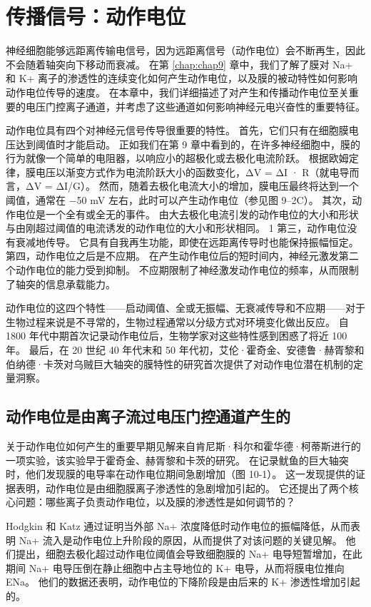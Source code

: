 \chapter{传播信号：动作电位} \label{chap:chap10}
神经细胞能够远距离传输电信号，因为远距离信号（动作电位）会不断再生，因此不会随着轴突向下移动而衰减。 
在第 \ref{chap:chap9} 章中，我们了解了膜对 Na+ 和 K+ 离子的渗透性的连续变化如何产生动作电位，以及膜的被动特性如何影响动作电位传导的速度。 
在本章中，我们详细描述了对产生和传播动作电位至关重要的电压门控离子通道，并考虑了这些通道如何影响神经元电兴奋性的重要特征。


动作电位具有四个对神经元信号传导很重要的特性。 
首先，它们只有在细胞膜电压达到阈值时才能启动。 
正如我们在第 9 章中看到的，在许多神经细胞中，膜的行为就像一个简单的电阻器，以响应小的超极化或去极化电流阶跃。 
根据欧姆定律，膜电压以渐变方式作为电流阶跃大小的函数变化，ΔV = ΔI · R（就电导而言，ΔV = ΔI/G）。 
然而，随着去极化电流大小的增加，膜电压最终将达到一个阈值，通常在 −50 mV 左右，此时可以产生动作电位（参见图 9–2C）。 
其次，动作电位是一个全有或全无的事件。 
由大去极化电流引发的动作电位的大小和形状与由刚超过阈值的电流诱发的动作电位的大小和形状相同。
1 第三，动作电位没有衰减地传导。 
它具有自我再生功能，即使在远距离传导时也能保持振幅恒定。 
第四，动作电位之后是不应期。 
在产生动作电位后的短时间内，神经元激发第二个动作电位的能力受到抑制。 
不应期限制了神经激发动作电位的频率，从而限制了轴突的信息承载能力。


动作电位的这四个特性——启动阈值、全或无振幅、无衰减传导和不应期——对于生物过程来说是不寻常的，生物过程通常以分级方式对环境变化做出反应。 
自 1800 年代中期首次记录动作电位后，生物学家对这些特性感到困惑了将近 100 年。 
最后，在 20 世纪 40 年代末和 50 年代初，艾伦·霍奇金、安德鲁·赫胥黎和伯纳德·卡茨对乌贼巨大轴突的膜特性的研究首次提供了对动作电位潜在机制的定量洞察。


\section{动作电位是由离子流过电压门控通道产生的}
关于动作电位如何产生的重要早期见解来自肯尼斯·科尔和霍华德·柯蒂斯进行的一项实验，该实验早于霍奇金、赫胥黎和卡茨的研究。 
在记录鱿鱼的巨大轴突时，他们发现膜的电导率在动作电位期间急剧增加（图 10-1）。 
这一发现提供的证据表明，动作电位是由细胞膜离子渗透性的急剧增加引起的。 
它还提出了两个核心问题：哪些离子负责动作电位，以及膜的渗透性是如何调节的？


Hodgkin 和 Katz 通过证明当外部 Na+ 浓度降低时动作电位的振幅降低，从而表明 Na+ 流入是动作电位上升阶段的原因，从而提供了对该问题的关键见解。 
他们提出，细胞去极化超过动作电位阈值会导致细胞膜的 Na+ 电导短暂增加，在此期间 Na+ 电导压倒在静止细胞中占主导地位的 K+ 电导，从而将膜电位推向 ENa。 
他们的数据还表明，动作电位的下降阶段是由后来的 K+ 渗透性增加引起的。


